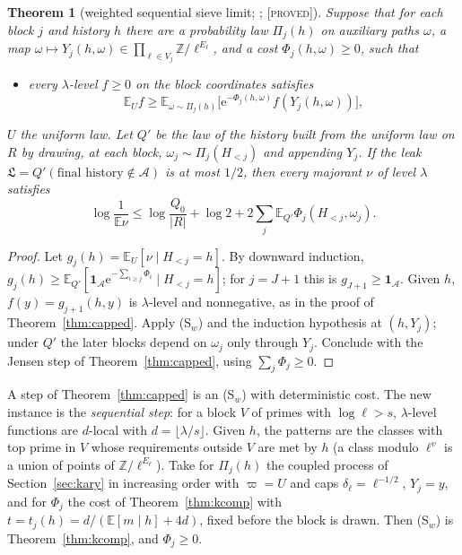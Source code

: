 \documentclass[10pt,reqno]{amsart}
\newtheorem{theorem}{Theorem}[section]
\theoremstyle{definition}
\theoremstyle{remark}
\newcommand{\A}{\mathcal A}
\newcommand{\E}{\mathbb E}
\newcommand{\Z}{\mathbb Z}
\newcommand{\ind}{\mathbf 1}
\newcommand{\e}{\mathrm e}
\newcommand{\lab}[1]{\textup{[\textsc{#1}]}}
\begin{document}
\begin{theorem}[weighted sequential sieve limit; {\cite[Thm~4.1]{KA}}; \lab{proved}]\label{thm:wseq}
Suppose that for each block $j$ and history $h$ there are a probability
law $\Pi_j(h)$ on auxiliary paths $\omega$, a map
$\omega\mapsto Y_j(h,\omega)\in\prod_{\ell\in V_j}\Z/\ell^{E_\ell}$, and a cost
$\Phi_j(h,\omega)\geq0$, such that
\begin{itemize}
\item[(S$_w$)] every $\lambda$-level $f\geq0$ on the block coordinates
  satisfies
  \[
   \E_Uf\geq\E_{\omega\sim\Pi_j(h)}\bigl[\e^{-\Phi_j(h,\omega)}f(Y_j(h,\omega))\bigr],
  \]
\end{itemize}
$U$ the uniform law.  Let $Q'$ be the law of the history built from the
uniform law on $R$ by drawing, at each block, $\omega_j\sim\Pi_j(H_{<j})$
and appending $Y_j$.  If the leak
$\mathfrak L=Q'(\text{final history}\notin\A)$ is at most $1/2$, then every
majorant $\nu$ of level $\lambda$ satisfies
\[
 \log\frac1{\E\nu}\leq\log\frac{Q_0}{|R|}+\log2+2\sum_j\E_{Q'}\Phi_j(H_{<j},\omega_j).
\]
\end{theorem}
\begin{proof}
Let $g_j(h)=\E_U[\nu\mid H_{<j}=h]$.  By downward induction,
$g_j(h)\geq\E_{Q'}[\ind_\A\e^{-\sum_{i\geq j}\Phi_i}\mid H_{<j}=h]$; for
$j=J+1$ this is $g_{J+1}\geq\ind_\A$.  Given $h$, $f(y)=g_{j+1}(h,y)$ is
$\lambda$-level and nonnegative, as in the proof of
Theorem~\ref{thm:capped}.  Apply (S$_w$) and the induction hypothesis at
$(h,Y_j)$; under $Q'$ the later blocks depend on $\omega_j$ only through
$Y_j$.  Conclude with the Jensen step of Theorem~\ref{thm:capped}, using
$\sum_j\Phi_j\geq0$.
\end{proof}
A step of Theorem~\ref{thm:capped} is an (S$_w$) with deterministic cost.
The new instance is the \emph{sequential step}: for a block $V$ of primes
with $\log\ell>s$, $\lambda$-level functions are $d$-local with
$d=\lfloor\lambda/s\rfloor$.  Given $h$, the patterns are the classes with
top prime in $V$ whose requirements outside $V$ are met by $h$ (a class
modulo $\ell^v$ is a union of points of $\Z/\ell^{E_\ell}$).  Take for
$\Pi_j(h)$ the coupled process of Section~\ref{sec:kary} in increasing
order with $\varpi=U$ and caps $\delta_\ell=\ell^{-1/2}$, $Y_j=y$, and for
$\Phi_j$ the cost of Theorem~\ref{thm:kcomp} with
$t=t_j(h)=d/(\E[m\mid h]+4d)$, fixed before the block is drawn.  Then
(S$_w$) is Theorem~\ref{thm:kcomp}, and $\Phi_j\geq0$.
\end{document}
